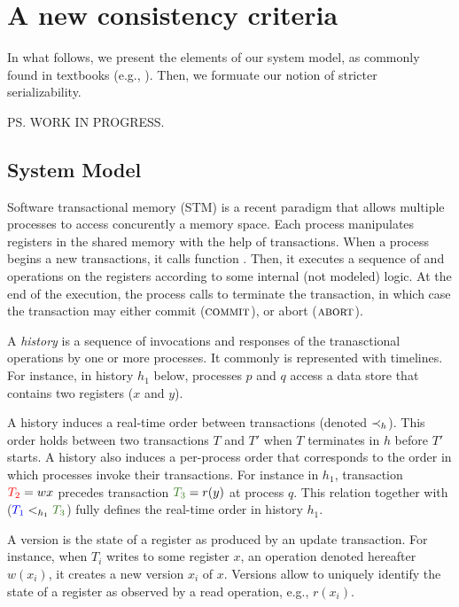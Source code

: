 \section{A new consistency criteria}

In what follows, we present the elements of our system model, as commonly found in textbooks (e.g., \cite{}).
Then, we formuate our notion of stricter serializability.

PS. WORK IN PROGRESS.

\subsection{System Model}

Software transactional memory (STM) is a recent paradigm that allows multiple processes to access concurently a memory space.
Each process manipulates registers in the shared memory with the help of transactions.
When a process begins a new transactions, it calls function \stmBeginFunction.
Then, it executes a sequence of \stmReadFunction and \stmWriteFunction operations on the registers according to some internal (not modeled) logic.
At the end of the execution, the process calls \stmTryCommitFunction to terminate the transaction, in which case the transaction may either commit ($\text{\textsc{commit}}$), or abort ($\text{\textsc{abort}}$).

A \emph{history} is a sequence of invocations and responses of the tranasctional operations by one or more processes.
It commonly is represented with timelines.
For instance, in history $h_1$ below, processes $p$ and $q$ access a data store that contains two registers ($x$ and $y$).

% 

A history induces a real-time order between transactions (denoted $\hb_h$).
This order holds between two transactions $T$ and $T'$ when $T$ terminates in $h$ before $T'$ starts.
A history also induces a per-process order that corresponds to the order in which processes invoke their transactions.
For instance in $h_1$, transaction ${\color{red}{T_2}}=w{x}$ precedes transaction ${\color{OliveGreen}{T_3}}=r(y)$ at process $q$.
This relation together with (${\color{blue}{T_1}} <_{h_1} {\color{OliveGreen}{T_3}}$) fully defines the real-time order in history $h_1$.

A version is the state of a register as produced by an update transaction.
For instance, when $T_i$ writes to some register $x$, an operation denoted hereafter $w(x_i)$, it creates a new version $x_i$ of $x$.
Versions allow to uniquely identify the state of a register as observed by a read operation, e.g., $r(x_i)$.

